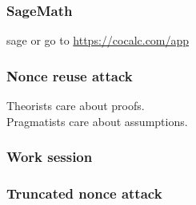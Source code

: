\documentclass{beamer}
\begin{document}
\begin{frame}
\frametitle{SageMath}
sage or go to \url{https://cocalc.com/app}
\end{frame}


\begin{frame}
\frametitle{Nonce reuse attack}
Theorists care about proofs. \\
Pragmatists care about assumptions.
\end{frame}

\begin{frame}
\frametitle{Work session}
\end{frame}

\begin{frame}
\frametitle{Truncated nonce attack}
\end{frame}
\end{document}
